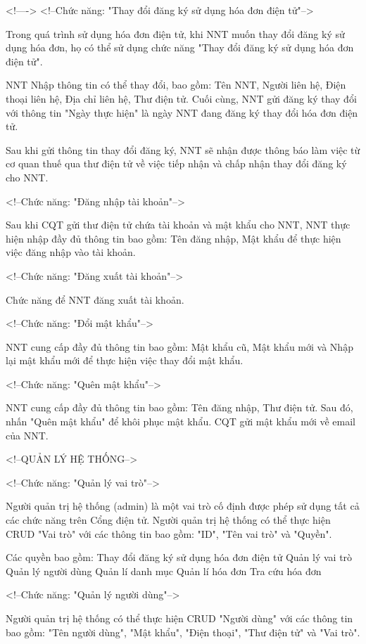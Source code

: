 <!---->
<!--Chức năng: "Thay đổi đăng ký sử dụng hóa đơn điện tử"-->

Trong quá trình sử dụng hóa đơn điện tử, khi NNT muốn thay đổi đăng ký sử dụng hóa đơn, họ có thể sử dụng chức năng "Thay đổi đăng ký sử dụng hóa đơn điện tử".

NNT Nhập thông tin có thể thay đổi, bao gồm: Tên NNT, Người liên hệ, Điện thoại liên hệ, Địa chỉ liên hệ, Thư điện tử.
Cuối cùng, NNT gửi đăng ký thay đổi với thông tin "Ngày thực hiện" là ngày NNT đang đăng ký thay đổi hóa đơn điện tử.

Sau khi gửi thông tin thay đổi đăng ký, NNT sẽ nhận được thông báo làm việc từ cơ quan thuế qua thư điện tử về việc tiếp nhận và chấp nhận thay đổi đăng ký cho NNT.

<!--Chức năng: "Đăng nhập tài khoản"-->

Sau khi CQT gửi thư điện tử chứa tài khoản và mật khẩu cho NNT, NNT thực hiện nhập đầy đủ thông tin bao gồm: Tên đăng nhập, Mật khẩu để thực hiện việc đăng nhập vào tài khoản.

<!--Chức năng: "Đăng xuất tài khoản"-->

Chức năng để NNT đăng xuất tài khoản.

<!--Chức năng: "Đổi mật khẩu"-->

NNT cung cấp đầy đủ thông tin bao gồm: Mật khẩu cũ, Mật khẩu mới và Nhập lại mật khẩu mới để thực hiện việc thay đổi mật khẩu.

<!--Chức năng: "Quên mật khẩu"-->

NNT cung cấp đầy đủ thông tin bao gồm: Tên đăng nhập, Thư điện tử. Sau đó, nhấn "Quên mật khẩu" để khôi phục mật khẩu. CQT gửi mật khẩu mới về email của NNT.

<!--QUẢN LÝ HỆ THỐNG-->

<!--Chức năng: "Quản lý vai trò"-->

Người quản trị hệ thống (admin) là một vai trò cố định được phép sử dụng tất cả các chức năng trên Cổng điện tử.
Người quản trị hệ thống có thể thực hiện CRUD "Vai trò" với các thông tin bao gồm: "ID", "Tên vai trò" và "Quyền".

Các quyền bao gồm:
Thay đổi đăng ký sử dụng hóa đơn điện tử
Quản lý vai trò
Quản lý người dùng
Quản lí danh mục
Quản lí hóa đơn
Tra cứu hóa đơn

<!--Chức năng: "Quản lý người dùng"-->

Người quản trị hệ thống có thể thực hiện CRUD "Người dùng" với các thông tin bao gồm: "Tên người dùng", "Mật khẩu", "Điện thoại", "Thư điện tử" và "Vai trò".

